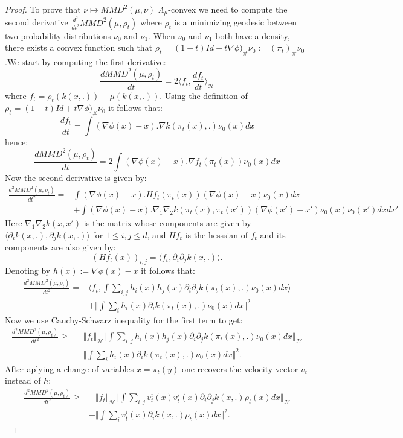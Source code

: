 \documentclass{article}
\newcommand{\1}{\mathbbm 1}
\theoremstyle{definition}
\begin{document}
\begin{proof}
To prove that $\nu\mapsto MMD^{2}(\mu,\nu)$ $\Lambda_{\mu}$-convex
we need to compute the second derivative $\frac{d^{2}}{dt^{2}}MMD^{2}(\mu,\rho_{t})$
where $\rho_{t}$ is a minimizing geodesic between two probability
distributions $\nu_{0}$ and $\nu_{1}$. When $\nu_{0}$ and $\nu_{1}$
both have a density, there exists a convex function such that $\rho_{t}=(1-t)Id+t\nabla\phi)_{\#}\nu_{0}:=(\pi_{t})_{\#}\nu_{0}$
.We start by computing the first derivative:
\[
\frac{dMMD^{2}(\mu,\rho_{t})}{dt}=2\langle f_{t},\frac{df_{t}}{dt}\rangle_{\mathcal{H}}
\]
where $f_{t}=\rho_{t}(k(x,.))-\mu(k(x,.))$. Using the definition
of $\rho_{t}=(1-t)Id+t\nabla\phi)_{\#}\nu_0$ it follows that:
\[
\frac{df_{t}}{dt}=\int(\nabla\phi(x)-x).\nabla k(\pi_{t}(x),.)\nu_{0}(x)dx
\]
hence:
\[
\frac{dMMD^{2}(\mu,\rho_{t})}{dt}=2\int(\nabla\phi(x)-x).\nabla f_{t}(\pi_{t}(x))\nu_{0}(x)dx
\]
Now the second derivative is given by:
\begin{align*}
\frac{d^{2}MMD^{2}(\mu,\rho_{t})}{dt^{2}}= & \int(\nabla\phi(x)-x).Hf_{t}(\pi_{t}(x))(\nabla\phi(x)-x)\nu_{0}(x)dx\\
 & +\int(\nabla\phi(x)-x).\nabla_{1}\nabla_{2}k(\pi_{t}(x),\pi_{t}(x'))(\nabla\phi(x')-x')\nu_{0}(x)\nu_{0}(x')dxdx'
\end{align*}
Here $\nabla_{1}\nabla_{2}k(x,x')$ is the matrix whose components
are given by $\langle\partial_{i}k(x,.),\partial_{j}k(x,.)\rangle$
for $1\leq i,j\leq d$, and $Hf_{t}$ is the hesssian of $f_{t}$
and its components are also given by:
\[
(Hf_{t}(x))_{i,j}=\langle f_{t},\partial_{i}\partial_{j}k(x,.)\rangle.
\]
Denoting by $h(x):=\nabla\phi(x)-x$ it follows that:
\begin{align*}
\frac{d^{2}MMD^{2}(\mu,\rho_{t})}{dt^{2}}= & \langle f_{t},\int\sum_{i,j}h_{i}(x)h_{j}(x)\partial_{i}\partial_{j}k(\pi_{t}(x),.)\nu_{0}(x)dx\rangle\\
 & +\Vert\int\sum_{i}h_{i}(x)\partial_{i}k(\pi_{t}(x),.)\nu_{0}(x)dx\Vert^{2}
\end{align*}
Now we use Cauchy-Schwarz inequality for the first term to get:
\begin{align*}
\frac{d^{2}MMD^{2}(\mu,\rho_{t})}{dt^{2}}\geq & -\Vert f_{t}\Vert_{\mathcal{H}}\Vert\int\sum_{i,j}h_{i}(x)h_{j}(x)\partial_{i}\partial_{j}k(\pi_{t}(x),.)\nu_{0}(x)dx\Vert_{\mathcal{H}}\\
 & +\Vert\int\sum_{i}h_{i}(x)\partial_{i}k(\pi_{t}(x),.)\nu_{0}(x)dx\Vert^{2}.
\end{align*}
After aplying a change of variables $x=\pi_{t}(y)$ one recovers the
velocity vector $v_{t}$ instead of $h$: 
\begin{align*}
\frac{d^{2}MMD^{2}(\mu,\rho_{t})}{dt^{2}}\geq & -\Vert f_{t}\Vert_{\mathcal{H}}\Vert\int\sum_{i,j}v_{t}^{i}(x)v_{t}^{j}(x)\partial_{i}\partial_{j}k(x,.)\rho_{t}(x)dx\Vert_{\mathcal{H}}\\
 & +\Vert\int\sum_{i}v_{t}^{i}(x)\partial_{i}k(x,.)\rho_{t}(x)dx\Vert^{2}.
\end{align*}


\end{proof}
\end{document}
